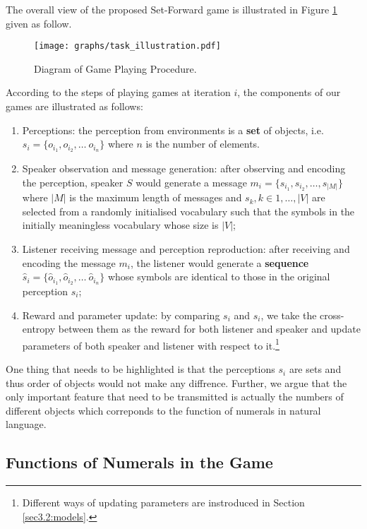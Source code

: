 The overall view of the proposed Set-Forward game is illustrated in Figure \ref{fig2:game_procedure} given as follow.

\begin{figure}[!h]
  \centering
  \texttt{[image: graphs/task\_illustration.pdf]}
  \caption{Diagram of Game Playing Procedure.}
  \label{fig2:game_procedure}
\end{figure}

According to the steps of playing games at iteration $i$, the components of our games are illustrated as follows:
\begin{enumerate}
  \item Perceptions: the perception from environments is a \textbf{set} of objects, i.e. $s_i=\{o_{i_1}, o_{i_2}, \dots\ o_{i_n}\}$ where $n$ is the number of elements.
  \item Speaker observation and message generation: after observing and encoding the perception, speaker $S$ would generate a message $m_i=\{s_{i_1}, s_{i_2}, \dots, s_{|M|}\}$ where $|M|$ is the maximum length of messages and $s_k, k \in {1, \dots, |V|}$ are selected from a randomly initialised vocabulary such that the symbols in the initially meaningless vocabulary whose size is $|V|$;
  \item Listener receiving message and perception reproduction: after receiving and encoding the message $m_i$, the listener would generate a \textbf{sequence} $\hat{s}_i = \{\hat{o}_{i_1}, \hat{o}_{i_2}, \dots\ \hat{o}_{i_n}\}$ whose symbols are identical to those in the original perception $s_i$;
  \item Reward and parameter update: by comparing $s_i$ and $\hat{s}_i$, we take the cross-entropy between them as the reward for both listener and speaker and update parameters of both speaker and listener with respect to it.\footnote{Different ways of updating parameters are instroduced in Section \ref{sec3.2:models}.}
\end{enumerate}

One thing that needs to be highlighted is that the perceptions $s_i$ are sets and thus order of objects would not make any diffrence. Further, we argue that the only important feature that need to be transmitted is actually the numbers of different objects which correponds to the function of numerals in natural language.

\subsection{Functions of Numerals in the Game}
\label{ssec3.1.2:numeral_in_game}

